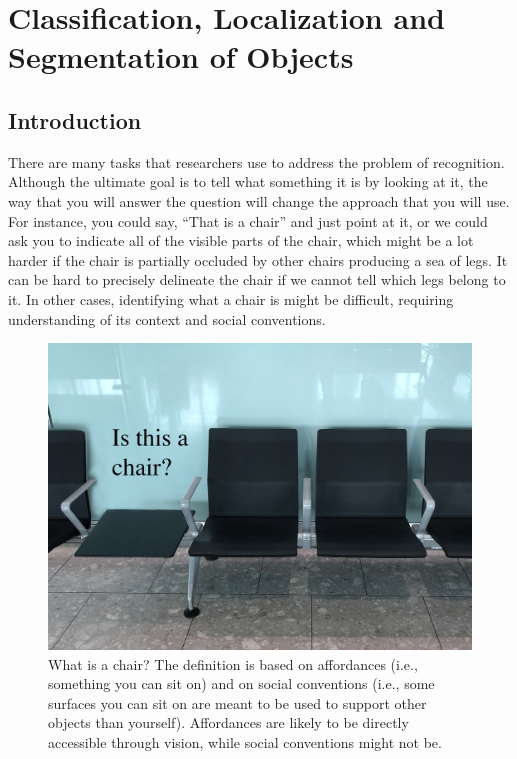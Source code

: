

\chapter{Classification, Localization and Segmentation of Objects}
\label{chapter:object_recognition}





\section{Introduction}

There are many tasks that researchers use to address  the problem of recognition. Although  the ultimate goal is to tell what something it is by looking at it, the way that you will answer the question will change the approach that you will use. For instance, you could say, ``That is a chair'' and just point at it, or we could ask you to indicate all of the visible parts of the chair, which might be a lot harder if the chair is partially occluded by other chairs producing a sea of legs. It can be hard to precisely delineate the chair if we cannot tell which legs belong to it. In other cases, identifying what a chair is might be difficult, requiring understanding of its context and social conventions.


\begin{figure}[h]
    \centerline{
        \includegraphics[width=0.7\linewidth]{figures/object_recognition/what_is_a_chair_with_text.jpg}
    }
    \caption{What is a chair? The definition is based on affordances (i.e., something you can sit on) and on social conventions (i.e., some surfaces you can sit on are meant to be used to support other objects than yourself). Affordances are likely to be directly accessible through vision, while social conventions might not be.}
\end{figure}

